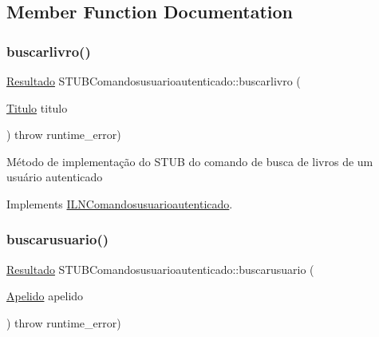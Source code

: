 \subsection{Member Function Documentation}
\mbox{\label{classSTUBComandosusuarioautenticado_a2befe1be25e27594d0eec3c767c3a145}} 
\subsubsection{\texorpdfstring{buscarlivro()}{buscarlivro()}}
{\footnotesize\ttfamily \hyperlink{classResultado}{Resultado} S\+T\+U\+B\+Comandosusuarioautenticado\+::buscarlivro (\begin{DoxyParamCaption}\item[{\hyperlink{classTitulo}{Titulo}}]{titulo }\end{DoxyParamCaption}) throw  runtime\+\_\+error) \hspace{0.3cm}{\ttfamily [virtual]}}

Método de implementação do S\+T\+UB do comando de busca de livros de um usuário autenticado 

Implements \hyperlink{classILNComandosusuarioautenticado}{I\+L\+N\+Comandosusuarioautenticado}.

\mbox{\label{classSTUBComandosusuarioautenticado_ab8b5ce430c1c47e95e1e7be8f7b26dda}} 
\subsubsection{\texorpdfstring{buscarusuario()}{buscarusuario()}}
{\footnotesize\ttfamily \hyperlink{classResultado}{Resultado} S\+T\+U\+B\+Comandosusuarioautenticado\+::buscarusuario (\begin{DoxyParamCaption}\item[{\hyperlink{classApelido}{Apelido}}]{apelido }\end{DoxyParamCaption}) throw  runtime\+\_\+error) \hspace{0.3cm}{\ttfamily [virtual]}}

